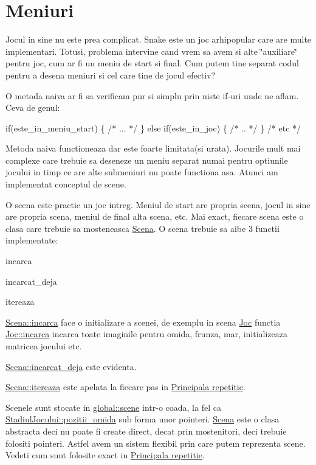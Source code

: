 \hypertarget{group__group__meniuri}{}\section{Meniuri}
\label{group__group__meniuri}
Jocul in sine nu este prea complicat. Snake este un joc arhipopular care are multe implementari. Totusi, problema intervine cand vrem sa avem si alte \char`\"{}auxiliare\char`\"{} pentru joc, cum ar fi un meniu de start si final. Cum putem tine separat codul pentru a desena meniuri si cel care tine de jocul efectiv?

O metoda naiva ar fi sa verificam pur si simplu prin niste if-\/uri unde ne aflam. Ceva de genul\+: 
\begin{DoxyCode}
\textcolor{keywordflow}{if}(este\_in\_meniu\_start) \{ \textcolor{comment}{/* ... */} \}
\textcolor{keywordflow}{else} \textcolor{keywordflow}{if}(este\_in\_joc) \{ \textcolor{comment}{/* .. */} \}
\textcolor{comment}{/* etc */}
\end{DoxyCode}


Metoda naiva functioneaza dar este foarte limitata(si urata). Jocurile mult mai complexe care trebuie sa deseneze un meniu separat numai pentru optiunile jocului in timp ce are alte submeniuri nu poate functiona asa. Atunci am implementat conceptul de scene.

O scena este practic un joc intreg. Meniul de start are propria scena, jocul in sine are propria scena, meniul de final alta scena, etc. Mai exact, fiecare scena este o clasa care trebuie sa mosteneasca \hyperlink{classScena}{Scena}. O scena trebuie sa aibe 3 functii implementate\+:
\begin{DoxyItemize}
\item incarca
\item incarcat\+\_\+deja
\item itereaza
\end{DoxyItemize}

\hyperlink{classScena_a6f53a1dcef68084361dc8f9d56bbb8c0}{Scena\+::incarca} face o initializare a scenei, de exemplu in scena \hyperlink{classJoc}{Joc} functia \hyperlink{classJoc_a54976207efdeeb45b42fd639215b65e3}{Joc\+::incarca} incarca toate imaginile pentru omida, frunza, mar, initializeaza matricea jocului etc.

\hyperlink{classScena_ac8de771024795dffa0e5feb8dba881ff}{Scena\+::incarcat\+\_\+deja} este evidenta.

\hyperlink{classScena_a9e5fcc831ed410b5b2422231ede746ee}{Scena\+::itereaza} este apelata la fiecare pas in \hyperlink{group__group__main__loop}{Principala repetitie}.

Scenele sunt stocate in \hyperlink{namespaceglobal_af4564594d950b73d4bb81b8c0a4fe029}{global\+::scene} intr-\/o coada, la fel ca \hyperlink{classStadiulJocului_a64e0608d9c68b22ea83fd5aba209453f}{Stadiul\+Jocului\+::pozitii\+\_\+omida} sub forma unor pointeri. \hyperlink{classScena}{Scena} este o clasa abstracta deci nu poate fi create direct, decat prin mostenitori, deci trebuie folositi pointeri. Astfel avem un sistem flexibil prin care putem reprezenta scene. Vedeti cum sunt folosite exact in \hyperlink{group__group__main__loop}{Principala repetitie}. 